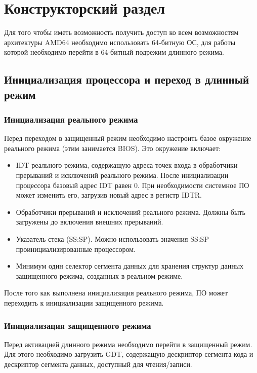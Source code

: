 \chapter{Конструкторский раздел}
\label{cha:design}

Для того чтобы иметь возможность получить доступ ко всем возможностям архитектуры AMD64
необходимо использовать 64-битную ОС, для работы которой необходимо перейти в 64-битный
подрежим длинного режима.

\section{Инициализация процессора и переход в длинный режим}
\label{sec:long_mode_activation}

\subsection{Инициализация реального режима}
Перед переходом в защищенный режим необходимо настроить базое окружение
реального режима (этим занимается BIOS). Это окружение включает:
\begin{itemize}
\item IDT реального режима, содержащую адреса точек входа в обработчики прерываний
	и исключений реального режима. После инициализации процессора базовый адрес IDT
	равен 0. При необходимости системное ПО может изменить его, загрузив новый адрес
	в регистр IDTR.
\item Обработчики прерываний и исключений реального режима. Должны быть загружены до
	включения внешних прерываний.
\item Указатель стека (SS:SP). Можно использовать значения SS:SP проинициализированные процессором.
\item Минимум один селектор сегмента данных для хранения структур данных защищенного режима,
	созданных в реальном режиме.
\end{itemize}

После того как выполнена инициализация реального режима, ПО может переходить к
инициализации защищенного режима.

\subsection{Инициализация защищенного режима}
Перед активацией длинного режима необходимо перейти в защищенный режим.
Для этого необходимо загрузить GDT, содержащую дескриптор сегмента кода и
дескриптор сегмента данных, доступный для чтения/записи.

